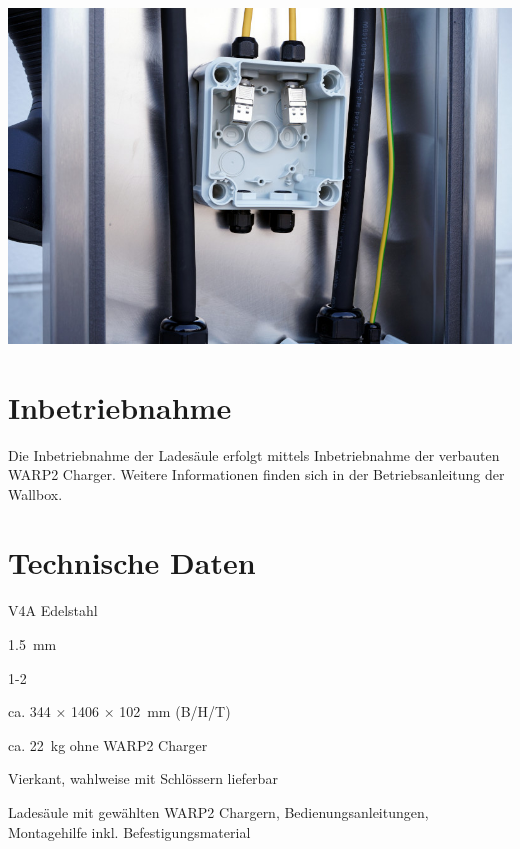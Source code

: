 \documentclass[a4paper,10pt]{article}
\begin{document}
\begin{multicols*}{2}
	\begin{center}
		\includegraphics[width=\linewidth]{./img/warp-charger-stand-eth}
	\end{center}

	\section{Inbetriebnahme}
	Die Inbetriebnahme der Ladesäule erfolgt mittels Inbetriebnahme der
	verbauten WARP2 Charger. Weitere Informationen finden sich in der
	Betriebsanleitung der Wallbox.

	\section{Technische Daten}

	\begin{minipage}{\linewidth}

		\begin{description}[leftmargin=!,labelwidth=\widthof{\textbf{Anzahl
		WARP2 Charger}}]
			\setlength{\itemsep}{3pt}
			\item[Material] V4A Edelstahl
			\item[Materialstärke] \SI{1.5}{\milli\meter}
			\item[Anzahl WARP2 Charger] 1-2
			\item[Abmessungen] ca. 344 × 1406 × \SI{102}{\milli\meter} (B/H/T)
			\item[Gewicht] ca. \SI{22}{\kilo\gram} ohne WARP2 Charger
			\item[Zugangsverriegelung]
			      Vierkant, wahlweise mit Schlössern lieferbar
			\item[Lieferumfang] Ladesäule mit gewählten WARP2 Chargern,
			      Bedienungsanleitungen, Montagehilfe inkl. Befestigungsmaterial
		\end{description}
	\end{minipage}


\end{multicols*}
\end{document}
